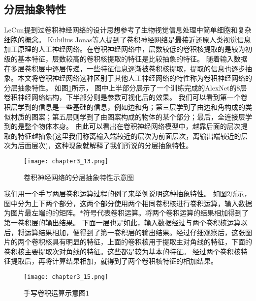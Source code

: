 \subsection{分层抽象特性}
LeCun\cite{726791}提到过卷积神经网络的设计思想参考了生物视觉信息处理中简单细胞和复杂细胞\cite{hubel1962}的概念。
Kubilius Jonas等人\cite{2019arXiv190906161K}提到了卷积神经网络是最接近还原人类视觉信息加工原理的人工神经网络。在卷积神经网络中，层数较低的卷积核提取的是较为初级的基本特征，层数较高的卷积核提取的特征是比较抽象的特征。
随着输入数据在多层卷积层中逐层传递，一些特征信息逐渐被卷积核提取，提取的信息也逐步抽象。本文将卷积神经网络这种区别于其他人工神经网络的特性称为卷积神经网络的分层抽象特性。
如图\ref{fig:chapter3_13}所示， 图中上半部分展示了一个训练完成的AlexNet\cite{alexnet2017}的8层卷积神经网络结构，下半部分则是参数可视化\cite{Zeiler2014,Mahendran_2015_CVPR}后的效果。
我们可以看到第一个卷积层学到的信息是一些基础的信息，例如边和角；第三层学到了由边和角构成的类似材质的图案；第五层则学到了由图案构成的物体的某个部分；最后，全连接层学到的是整个物体本身。
由此可以看出在卷积神经网络模型中，越靠后面的层次提取的特征越抽象(这里我们称离输入端较近的层次为前面层次，离输出端较近的层次为后面层次)，这种现象就解释了我们所说的分层抽象特性。
\begin{figure}
    \centering
    \texttt{[image: chapter3\_13.png]}
    \caption{卷积神经网络的分层抽象特性示意图}
    \label{fig:chapter3_13}
\end{figure}


我们用一个手写两层卷积运算过程的例子来举例说明这种抽象特性。
如图\ref{fig:chapter3_15}所示，图中分为上下两个部分，这两个部分使用两个相同卷积核进行卷积运算，输入数据为图片最左端的的矩阵。$\ast$符号代表卷积运算。将两个卷积运算的结果相加得到了第一卷积层的输出结果。
下面一层也是如此，输入数据经过与两个卷积核运算以后，将运算结果相加，便得到了第一卷积层的输出结果。经过仔细观察后，这张图片的两个卷积核具有明显的特征，上面的卷积核用于提取主对角线的特征，下面的卷积核主要提取次对角线的特征。这些都是较为基本的特征。
经过两个卷积核特征提取后，再将计算结果相加，就得到了两个卷积核特征的相加结果。
\begin{figure}
    \centering
    \texttt{[image: chapter3\_15.png]}
    \caption{手写卷积运算示意图1}
    \label{fig:chapter3_15}
\end{figure}


